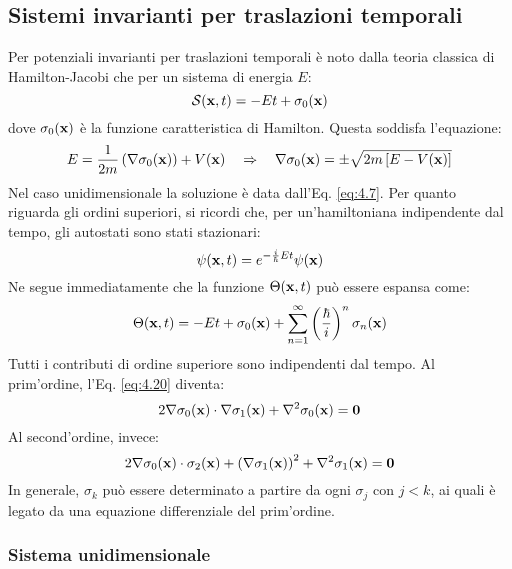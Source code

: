 \subsection{Sistemi invarianti per traslazioni temporali}

Per potenziali invarianti per traslazioni temporali è noto dalla teoria classica di Hamilton-Jacobi che per un sistema di energia $ E $:
\begin{equation}
	\mathcal{S}(\mathbf{x},t) = -E t + \sigma_0(\mathbf{x})
	\label{eq:4.23}
\end{equation}
dove $ \sigma_0(\mathbf{x}) $ è la funzione caratteristica di Hamilton. Questa soddisfa l'equazione:
\begin{equation}
	E = \frac{1}{2m} \left( \nabla \sigma_0(\mathbf{x}) \right) + V(\mathbf{x})
	\quad \Rightarrow \quad
	\nabla \sigma_0(\mathbf{x}) = \pm \sqrt{2m \left[ E - V(\mathbf{x}) \right]}
	\label{eq:4.24}
\end{equation}
Nel caso unidimensionale la soluzione è data dall'Eq. \ref{eq:4.7}. Per quanto riguarda gli ordini superiori, si ricordi che, per un'hamiltoniana indipendente dal tempo, gli autostati sono stati stazionari:
\begin{equation}
	\psi(\mathbf{x},t) = e^{-\frac{i}{\hbar} E t} \psi(\mathbf{x})
	\label{eq:4.25}
\end{equation}
Ne segue immediatamente che la funzione $ \Theta(\mathbf{x},t) $ può essere espansa come:
\begin{equation}
	\Theta(\mathbf{x},t) = -E t + \sigma_0(\mathbf{x}) + \sum_{n = 1}^{\infty} \left( \frac{\hbar}{i} \right)^n \sigma_n(\mathbf{x})
	\label{eq:4.26}
\end{equation}
Tutti i contributi di ordine superiore sono indipendenti dal tempo. Al prim'ordine, l'Eq. \ref{eq:4.20} diventa:
\begin{equation}
	2 \nabla \sigma_0(\mathbf{x}) \cdot \nabla \sigma_1(\mathbf{x}) + \nabla^2 \sigma_0(\mathbf{x}) = \mathbf{0}
	\label{eq:4.27}
\end{equation}
Al second'ordine, invece:
\begin{equation}
	2 \nabla \sigma_0(\mathbf{x}) \cdot \sigma_2(\mathbf{x}) + \left( \nabla \sigma_1(\mathbf{x}) \right)^2 + \nabla^2 \sigma_1(\mathbf{x}) = \mathbf{0}
	\label{eq:4.28}
\end{equation}
In generale, $ \sigma_k $ può essere determinato a partire da ogni $ \sigma_j $ con $ j < k $, ai quali è legato da una equazione differenziale del prim'ordine.

\subsubsection{Sistema unidimensionale}

